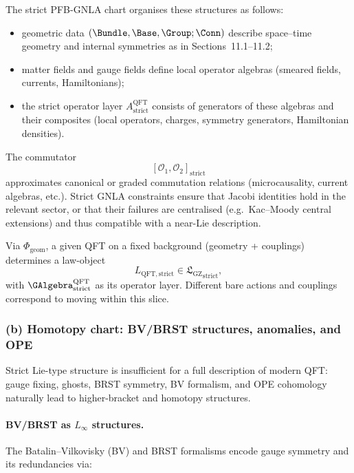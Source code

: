 \documentclass[11pt]{book}
\theoremstyle{plain}
\theoremstyle{definition}
\newcommand{\GZLS}{\ensuremath{\mathfrak{L}_{\mathrm{GZ}}}}       \newcommand{\GZLT}{\ensuremath{M_{!w}}}                           \newcommand{\GZLOC}{\ensuremath{A_M}}                             \newcommand{\GZLCurv}{\ensuremath{\mathcal{F}_{\mathrm{law}}}}
\begin{document}
The strict PFB-GNLA chart organises these structures as follows:

\begin{itemize}
  \item geometric data $(\Bundle,\Base,\Group;\Conn)$ describe space--time
        geometry and internal symmetries as in Sections~11.1--11.2;
  \item matter fields and gauge fields define local operator algebras
        (smeared fields, currents, Hamiltonians);
  \item the strict operator layer $A_{\mathrm{strict}}^{\mathrm{QFT}}$
        consists of generators of these algebras and their composites
        (local operators, charges, symmetry generators, Hamiltonian
        densities).
\end{itemize}

The commutator
\[
  [\mathcal{O}_1,\mathcal{O}_2]_{\mathrm{strict}}
\]
approximates canonical or graded commutation relations (microcausality,
current algebras, etc.). Strict GNLA constraints ensure that Jacobi
identities hold in the relevant sector, or that their failures are
centralised (e.g.\ Kac--Moody central extensions) and thus compatible
with a near-Lie description.

Via $\Phi_{\mathrm{geom}}$, a given QFT on a fixed background
(geometry + couplings) determines a law-object
\[
  L_{\mathrm{QFT,strict}}
  \in {\GZLS}_{\mathrm{strict}},
\]
with $\GAlgebra_{\mathrm{strict}}^{\mathrm{QFT}}$ as its operator
layer. Different bare actions and couplings correspond to moving within
this slice.



\subsubsection*{(b) Homotopy chart: BV/BRST structures, anomalies, and OPE}

Strict Lie-type structure is insufficient for a full description of
modern QFT: gauge fixing, ghosts, BRST symmetry, BV formalism, and OPE
cohomology naturally lead to higher-bracket and homotopy structures.

\paragraph{BV/BRST as $L_\infty$ structures.}

The Batalin--Vilkovisky (BV) and BRST formalisms encode gauge symmetry
and its redundancies via:
\end{document}
